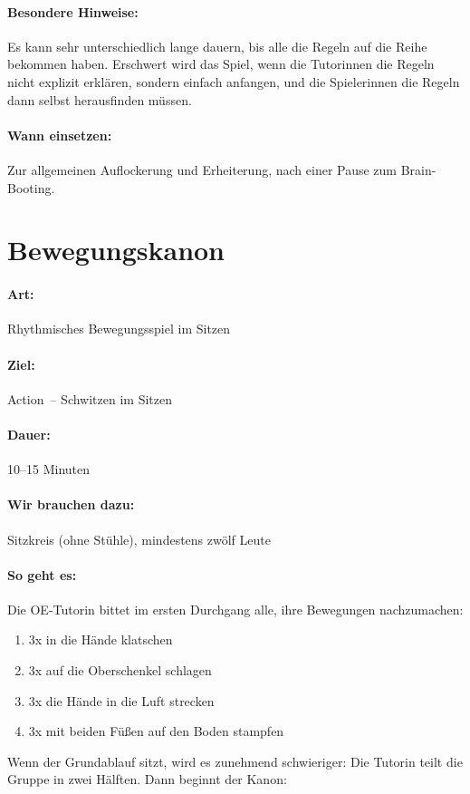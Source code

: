 \paragraph{Besondere Hinweise:} Es kann sehr unterschiedlich lange dauern, bis alle die Regeln auf die Reihe bekommen haben. Erschwert wird das Spiel, wenn die Tutorinnen die Regeln nicht explizit erklären, sondern einfach anfangen, und die Spielerinnen die Regeln dann selbst herausfinden müssen.
\paragraph{Wann einsetzen:} Zur allgemeinen Auflockerung und Erheiterung, nach einer Pause zum Brain-Booting.

\section{Bewegungskanon}
\paragraph{Art:} Rhythmisches Bewegungsspiel im Sitzen
\paragraph{Ziel:} Action~-- Schwitzen im Sitzen
\paragraph{Dauer:} 10--15 Minuten
\paragraph{Wir brauchen dazu:} Sitzkreis (ohne Stühle), mindestens zwölf Leute
\paragraph{So geht es:} Die OE-Tutorin bittet im ersten Durchgang alle, ihre Bewegungen nachzumachen:
\begin{enumerate}
\item 3x in die Hände klatschen
\item 3x auf die Oberschenkel schlagen
\item 3x die Hände in die Luft strecken
\item 3x mit beiden Füßen auf den Boden stampfen
\end{enumerate}
Wenn der Grundablauf sitzt, wird es zunehmend schwieriger: Die Tutorin teilt die Gruppe in zwei Hälften. Dann beginnt der Kanon:


